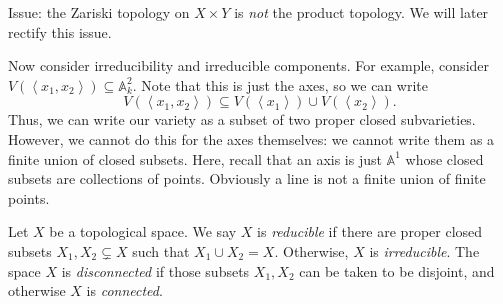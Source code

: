 Issue: the Zariski topology on $X\times Y$ is \emph{not} the product topology. We will later rectify this issue.


Now consider irreducibility and irreducible components. For example, consider $V(\left\langle x_1,x_2 \right\rangle ) \subseteq \mathbb{A} _k^2$. Note that this is just the axes, so we can write
\[
	V(\left\langle x_1,x_2 \right\rangle ) \subseteq V(\left\langle x_1 \right\rangle ) \cup V(\left\langle x_2 \right\rangle )
.\]
Thus, we can write our variety as a subset of two proper closed subvarieties. However, we cannot do this for the axes themselves: we cannot write them as a finite union of closed subsets. Here, recall that an axis is just $\mathbb{A} ^1$ whose closed subsets are collections of points. Obviously a line is not a finite union of finite points.

\begin{definition}\label{dfn:?}
	Let $X$ be a topological space. We say $X$ is \emph{reducible} if there are proper closed subsets $X_1,X_2 \subsetneq X$ such that $X_1 \cup X_2 = X$. Otherwise, $X$ is \emph{irreducible}. The space $X$ is \emph{disconnected} if those subsets $X_1,X_2$ can be taken to be disjoint, and otherwise $X$ is \emph{connected}.
\end{definition}


